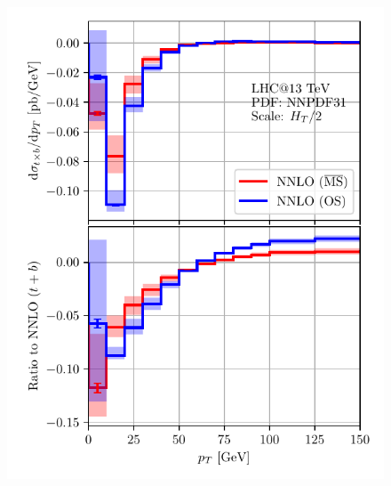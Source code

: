\begin{figure}[h]
\begin{minipage}[t]{0.49\textwidth}
  \includegraphics[width=\textwidth]{Images/pT_MS_OS_comparison_13000.pdf}
\end{minipage}
\begin{minipage}[t]{0.49\textwidth}

\end{minipage}
\end{figure}
